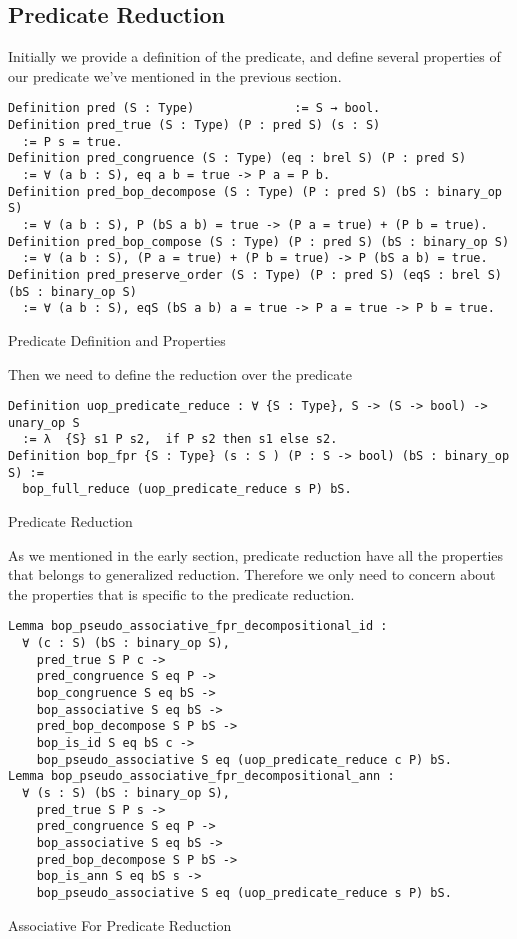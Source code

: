 \subsection{Predicate Reduction}
Initially we provide a definition of the predicate, and define several properties of our predicate we've mentioned in the previous section.
\begin{listing}[H]
\begin{verbatim}
Definition pred (S : Type)              := S → bool.
Definition pred_true (S : Type) (P : pred S) (s : S) 
  := P s = true. 
Definition pred_congruence (S : Type) (eq : brel S) (P : pred S) 
  := ∀ (a b : S), eq a b = true -> P a = P b.
Definition pred_bop_decompose (S : Type) (P : pred S) (bS : binary_op S) 
  := ∀ (a b : S), P (bS a b) = true -> (P a = true) + (P b = true).
Definition pred_bop_compose (S : Type) (P : pred S) (bS : binary_op S) 
  := ∀ (a b : S), (P a = true) + (P b = true) -> P (bS a b) = true.
Definition pred_preserve_order (S : Type) (P : pred S) (eqS : brel S) (bS : binary_op S)
  := ∀ (a b : S), eqS (bS a b) a = true -> P a = true -> P b = true.
\end{verbatim}
\caption{Predicate Definition and Properties} 
\label{coq:def:predicate}
\end{listing}
Then we need to define the reduction over the predicate 
\begin{listing}[H]
\begin{verbatim}
Definition uop_predicate_reduce : ∀ {S : Type}, S -> (S -> bool) -> unary_op S 
  := λ  {S} s1 P s2,  if P s2 then s1 else s2.
Definition bop_fpr {S : Type} (s : S ) (P : S -> bool) (bS : binary_op S) := 
  bop_full_reduce (uop_predicate_reduce s P) bS.
\end{verbatim}
\caption{Predicate Reduction} 
\label{coq:def:predicate_reduction}
\end{listing}
As we mentioned in the early section, predicate reduction have all the properties that belongs to generalized reduction. Therefore we only need to concern about the properties that is specific to the predicate reduction.
\begin{listing}[H]
\begin{verbatim}
Lemma bop_pseudo_associative_fpr_decompositional_id :
  ∀ (c : S) (bS : binary_op S),
    pred_true S P c ->
    pred_congruence S eq P ->
    bop_congruence S eq bS ->     
    bop_associative S eq bS -> 
    pred_bop_decompose S P bS ->
    bop_is_id S eq bS c -> 
    bop_pseudo_associative S eq (uop_predicate_reduce c P) bS. 
Lemma bop_pseudo_associative_fpr_decompositional_ann :
  ∀ (s : S) (bS : binary_op S),
    pred_true S P s -> 
    pred_congruence S eq P ->
    bop_associative S eq bS ->    
    pred_bop_decompose S P bS ->
    bop_is_ann S eq bS s ->     
    bop_pseudo_associative S eq (uop_predicate_reduce s P) bS.

\end{verbatim}
\caption{Associative For Predicate Reduction} 
\label{coq:proof:predicate_associative}
\end{listing}
